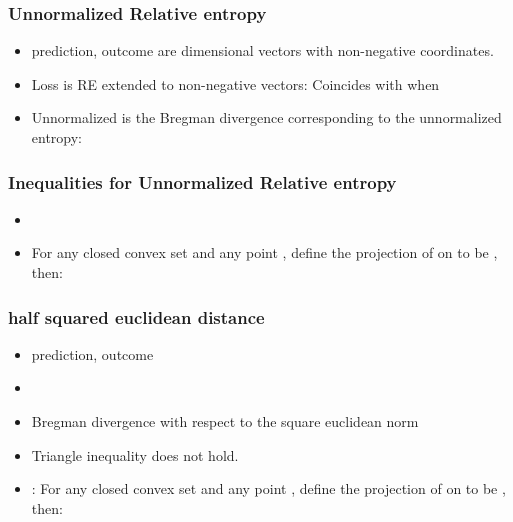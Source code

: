 \documentclass[handout]{beamer}
\begin{document}
\begingroup
\small
\begin{frame}
\frametitle{Unnormalized Relative entropy} 
\begin{itemize}
\item prediction, outcome \R{$\vecp,\vecq$} are  dimensional
  vectors with non-negative coordinates. 
\item Loss is RE extended to non-negative vectors:
\R{\[ \RE{\vecp}{\vecq} = \sum_{i=1}^n p_i \log \frac{p_i}{q_i} -
    \sum_{i=1}^n (q_i-p_i) \]}
Coincides with  when 
\item Unnormalized  is the Bregman divergence corresponding to
  the unnormalized entropy:
  \R{\[
      F(\vecp) = \sum_{i=1}^n p_i \log p_i - \sum_{i=1}^n p_i
    \]}
\end{itemize}
\end{frame}

\begin{frame}
\frametitle{Inequalities for Unnormalized Relative entropy} 
\begin{itemize}
\item
{} 
\item {}
  For any closed convex set  and any point , define the projection of  on  to be
  , then:
\end{itemize}
\end{frame}

\begin{frame}
\frametitle{half squared euclidean distance}
\begin{itemize}
\item prediction, outcome 
\item
  \R{\[ \lambda_{\text{sq}}(\vu,\vv)  = \frac{1}{2} \|\vu-\vv\|^2 =
      \frac{1}{2} \sum_{i=1}^n (u_i - v_i)^2
  \]}
\item
Bregman divergence with respect to the square euclidean norm
\item Triangle inequality does not hold.
\item {} :
  For any closed convex set  and any point , define the projection of  on  to be 
  , then:
\end{itemize}
\end{frame}
\endgroup
\end{document}

